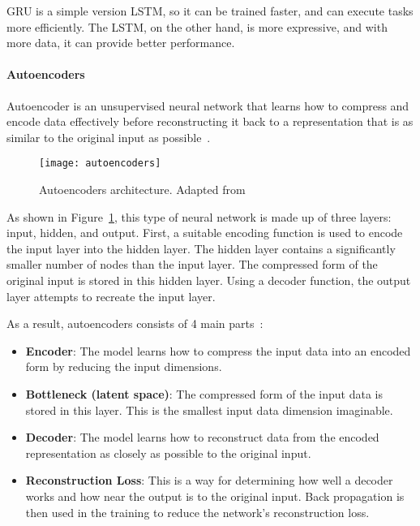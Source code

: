\gls{GRU} is a simple version \gls{LSTM}, so it can be trained faster, and can execute tasks more efficiently. The \gls{LSTM}, on the other hand, is more expressive, and with more data, it can provide better performance.

\paragraph{Autoencoders}

Autoencoder is an unsupervised neural network that learns how to compress and encode data effectively before reconstructing it back to a representation that is as similar to the original input as possible~\cite{LopezPinaya2020Autoencoders}.

\begin{figure}[htbp]
    \centering
    \texttt{[image: autoencoders]}
    \caption{Autoencoders architecture. Adapted from~\cite{Madhavan2021DeepDeveloper}}
    \label{fig:autoencoders}
\end{figure}

As shown in Figure~\ref{fig:autoencoders}, this type of neural network is made up of three layers: input, hidden, and output. First, a suitable encoding function is used to encode the input layer into the hidden layer. The hidden layer contains a significantly smaller number of nodes than the input layer. The compressed form of the original input is stored in this hidden layer. Using a decoder function, the output layer attempts to recreate the input layer. 

As a result, autoencoders consists of 4 main parts~\cite{Abirami2020Energy-efficientSystem,LopezPinaya2020Autoencoders}:

\begin{itemize}
    \item \textbf{Encoder}: The model learns how to compress the input data into an encoded form by reducing the input dimensions.
    \item \textbf{Bottleneck (latent space)}: The compressed form of the input data is stored in this layer. This is the smallest input data dimension imaginable.
    \item \textbf{Decoder}: The model learns how to reconstruct data from the encoded representation as closely as possible to the original input.
    \item \textbf{Reconstruction Loss}: This is a way for determining how well a decoder works and how near the output is to the original input. Back propagation is then used in the training to reduce the network's reconstruction loss.
\end{itemize}

